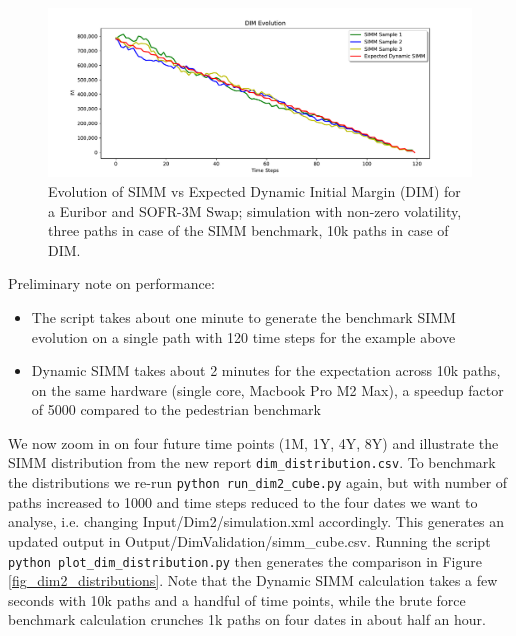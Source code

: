 \begin{figure}[h!]
\begin{center}
\includegraphics[scale=0.5]{examples/mpl_dim_comparison_3.pdf}
\end{center}
\caption{Evolution of SIMM vs Expected Dynamic Initial Margin (DIM) for a Euribor and SOFR-3M Swap;
  simulation with non-zero volatility, three paths in case of the SIMM benchmark, 10k paths in case of DIM.}
\label{fig_dim2_comparison_3}
\end{figure}

Preliminary note on performance:
\begin{itemize}
\item The script takes about one minute to generate the benchmark SIMM evolution on a single path with 120 time steps
  for the example above
\item Dynamic SIMM takes about 2 minutes for the expectation across 10k paths, on the same hardware (single core, Macbook Pro M2 Max),
  a speedup factor of 5000 compared to the pedestrian benchmark
\end{itemize}

We now zoom in on four future time points (1M, 1Y, 4Y, 8Y) and illustrate the SIMM distribution from the new
report {\tt dim\_distribution.csv}. To benchmark the distributions we re-run {\tt python run\_dim2\_cube.py}
again, but with number of paths increased to 1000 and time steps reduced to the four dates we want to analyse,
i.e. changing Input/Dim2/simulation.xml accordingly. This generates an updated output in Output/DimValidation/simm\_cube.csv.
Running the script {\tt python plot\_dim\_distribution.py} then generates the comparison in Figure
\ref{fig_dim2_distributions}. Note that the Dynamic SIMM calculation takes a few seconds with 10k paths and a handful of time points,
while the brute force benchmark calculation crunches 1k paths on four dates in about half an hour.

